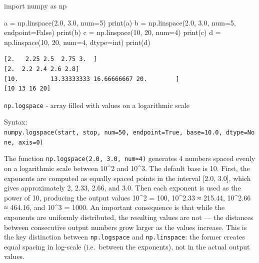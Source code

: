 \documentclass[
  english,
  letterpaper,
  DIV=11,
  numbers=noendperiod]{scrreprt}
\newenvironment{Shaded}{\begin{snugshade}}{\end{snugshade}}
\newcommand{\BuiltInTok}[1]{\textcolor[rgb]{0.00,0.23,0.31}{#1}}
\newcommand{\DecValTok}[1]{\textcolor[rgb]{0.68,0.00,0.00}{#1}}
\newcommand{\FloatTok}[1]{\textcolor[rgb]{0.68,0.00,0.00}{#1}}
\newcommand{\ImportTok}[1]{\textcolor[rgb]{0.00,0.46,0.62}{#1}}
\newcommand{\NormalTok}[1]{\textcolor[rgb]{0.00,0.23,0.31}{#1}}
\newcommand{\OperatorTok}[1]{\textcolor[rgb]{0.37,0.37,0.37}{#1}}
\newcommand{\VariableTok}[1]{\textcolor[rgb]{0.07,0.07,0.07}{#1}}
\begin{document}
\begin{Shaded}
\begin{Highlighting}[]
\ImportTok{import}\NormalTok{ numpy }\ImportTok{as}\NormalTok{ np}

\NormalTok{a }\OperatorTok{=}\NormalTok{ np.linspace(}\FloatTok{2.0}\NormalTok{, }\FloatTok{3.0}\NormalTok{, num}\OperatorTok{=}\DecValTok{5}\NormalTok{)}
\BuiltInTok{print}\NormalTok{(a)}
\NormalTok{b }\OperatorTok{=}\NormalTok{ np.linspace(}\FloatTok{2.0}\NormalTok{, }\FloatTok{3.0}\NormalTok{, num}\OperatorTok{=}\DecValTok{5}\NormalTok{, endpoint}\OperatorTok{=}\VariableTok{False}\NormalTok{)}
\BuiltInTok{print}\NormalTok{(b)}
\NormalTok{c }\OperatorTok{=}\NormalTok{ np.linspace(}\DecValTok{10}\NormalTok{, }\DecValTok{20}\NormalTok{, num}\OperatorTok{=}\DecValTok{4}\NormalTok{)}
\BuiltInTok{print}\NormalTok{(c)}
\NormalTok{d }\OperatorTok{=}\NormalTok{ np.linspace(}\DecValTok{10}\NormalTok{, }\DecValTok{20}\NormalTok{, num}\OperatorTok{=}\DecValTok{4}\NormalTok{, dtype}\OperatorTok{=}\BuiltInTok{int}\NormalTok{)}
\BuiltInTok{print}\NormalTok{(d)}
\end{Highlighting}
\end{Shaded}

\begin{verbatim}
[2.   2.25 2.5  2.75 3.  ]
[2.  2.2 2.4 2.6 2.8]
[10.         13.33333333 16.66666667 20.        ]
[10 13 16 20]
\end{verbatim}

\texttt{np.logspace} - array filled with values on a logarithmic scale

Syntax:
\texttt{numpy.logspace(start,\ stop,\ num=50,\ endpoint=True,\ base=10.0,\ dtype=None,\ axis=0)}

The function \texttt{np.logspace(2.0,\ 3.0,\ num=4)} generates 4 numbers
spaced evenly on a logarithmic scale between 10\^{}2 and 10\^{}3. The
default base is 10. First, the exponents are computed as equally spaced
points in the interval {[}2.0, 3.0{]}, which gives approximately 2,
2.33, 2.66, and 3.0. Then each exponent is used as the power of 10,
producing the output values 10\^{}2 = 100, 10\^{}2.33 ≈ 215.44,
10\^{}2.66 ≈ 464.16, and 10\^{}3 = 1000. An important consequence is
that while the exponents are uniformly distributed, the resulting values
are not --- the distances between consecutive output numbers grow larger
as the values increase. This is the key distinction between
\texttt{np.logspace} and \texttt{np.linspace}: the former creates equal
spacing in log-scale (i.e.~between the exponents), not in the actual
output values.
\end{document}
